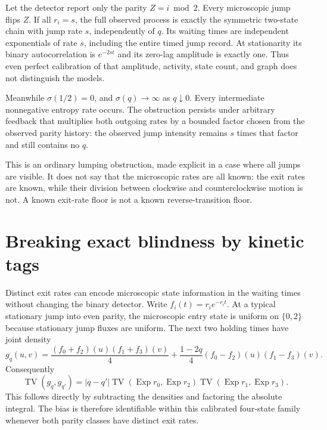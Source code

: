 Let the detector report only the parity $Z=i\bmod2$. Every microscopic jump
flips $Z$. If all $r_i=s$, the full observed process is exactly the symmetric
two-state chain with jump rate $s$, independently of $q$. Its waiting times are
independent exponentials of rate $s$, including the entire timed jump record.
At stationarity its binary autocorrelation is $e^{-2st}$ and its zero-lag
amplitude is exactly one. Thus even perfect calibration of that amplitude,
activity, state count, and graph does not distinguish the models.

Meanwhile $\sigma(1/2)=0$, and $\sigma(q)\to\infty$ as $q\downarrow0$.
Every intermediate nonnegative entropy rate occurs. The obstruction persists
under arbitrary feedback that multiplies both outgoing rates by a bounded
factor chosen from the observed parity history: the observed jump intensity
remains $s$ times that factor and still contains no $q$.

This is an ordinary lumping obstruction, made explicit in a case where all
jumps are visible. It does not say that the microscopic rates are all known:
the exit rates are known, while their division between clockwise and
counterclockwise motion is not. A known exit-rate floor is not a known
reverse-transition floor.

\section{Breaking exact blindness by kinetic tags}
Distinct exit rates can encode microscopic state information in the waiting
times without changing the binary detector. Write
$f_i(t)=r_i e^{-r_i t}$. At a typical stationary jump into even parity, the
microscopic entry state is uniform on $\{0,2\}$ because stationary jump fluxes
are uniform. The next two holding times have joint density
\begin{equation}
 g_q(u,v)=\frac{(f_0+f_2)(u)(f_1+f_3)(v)}4
       +\frac{1-2q}{4}(f_0-f_2)(u)(f_1-f_3)(v).
                                                        \label{eq:dl-pair}
\end{equation}
Consequently
\begin{equation}
 \operatorname{TV}(g_q,g_{q'})
 =|q-q'|\operatorname{TV}(\operatorname{Exp}r_0,\operatorname{Exp}r_2)
          \operatorname{TV}(\operatorname{Exp}r_1,\operatorname{Exp}r_3).
                                                        \label{eq:dl-pair-tv}
\end{equation}
This follows directly by subtracting the densities and factoring the absolute
integral. The bias is therefore identifiable within this calibrated four-state
family whenever both parity classes have distinct exit rates.

